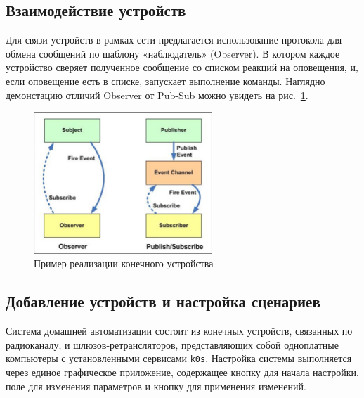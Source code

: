\documentclass[a4paper,12pt]{article}
\begin{document}
\subsection{Взаимодействие устройств}
Для связи устройств в рамках сети предлагается использование протокола для обмена сообщений по шаблону «наблюдатель» (Observer). В котором каждое устройство сверяет полученное сообщение со списком реакций на оповещения, и, если оповещение есть в списке, запускает выполнение команды. Наглядно демонстацию отличий Observer от Pub-Sub можно увидеть на рис.~\ref{fig:Observer_vs_pub_sub}.

\begin{figure}[h]
    \centering
    \includegraphics[width=0.6\textwidth]{images/Fig08.png}
    \caption{Пример реализации конечного устройства}
    \label{fig:Observer_vs_pub_sub}
\end{figure}

\subsection{Добавление устройств и настройка сценариев}

Система домашней автоматизации состоит из конечных устройств, связанных по радиоканалу, и шлюзов-ретрансляторов, представляющих собой одноплатные компьютеры с установленными сервисами \texttt{k0s}. Настройка системы выполняется через единое графическое приложение, содержащее кнопку для начала настройки, поле для изменения параметров и кнопку для применения изменений.
\end{document}

